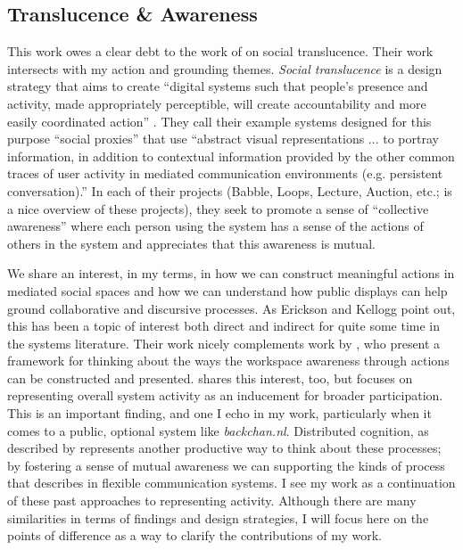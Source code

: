 \documentclass{tufte-handout}
\begin{document}
\subsection{Translucence \& Awareness}

This work owes a clear debt to the work of \citet{Erickson:2000kb} on social translucence. Their work intersects with my action and grounding themes. \emph{Social translucence} is a design strategy that aims to create ``digital systems such that people's presence and activity, made appropriately perceptible, will create accountability and more easily coordinated action''  \citep{Kellogg:2002ts}. They call their example systems designed for this purpose ``social proxies'' that use ``abstract visual representations ... to portray information, in addition to contextual information provided by the other common traces of user activity in mediated communication environments (e.g. persistent conversation).'' In each of their projects (Babble, Loops, Lecture, Auction, etc.; \citep{Erickson:2003td} is a nice overview of these projects), they seek to promote a sense of ``collective awareness'' where each person using the system has a sense of the actions of others in the system and appreciates that this awareness is mutual. 

We share an interest, in my terms, in how we can construct meaningful actions in mediated social spaces and how we can understand how public displays can help ground collaborative and discursive processes. As Erickson and Kellogg point out, this has been a topic of interest both direct and indirect for quite some time in the systems literature. Their work nicely complements work by \citet{Gutwin:2002tf}, who present a framework for thinking about the ways the workspace awareness through actions can be constructed and presented.  \citet{Ackerman:1995tj} shares this interest, too, but focuses on representing overall system activity as an inducement for broader participation. This is an important finding, and one I echo in my work, particularly when it comes to a public, optional system like \emph{backchan.nl}. Distributed cognition, as described by \citet{Hollan:2000ud} represents another productive way to think about these processes; by fostering a sense of mutual awareness we can supporting the kinds of process that \citet{Hutchins:1995ud} describes in flexible communication systems. I see my work as a continuation of these past approaches to representing activity. Although there are many similarities in terms of findings and design strategies, I will focus here on the points of difference as a way to clarify the contributions of my work.
\end{document}

